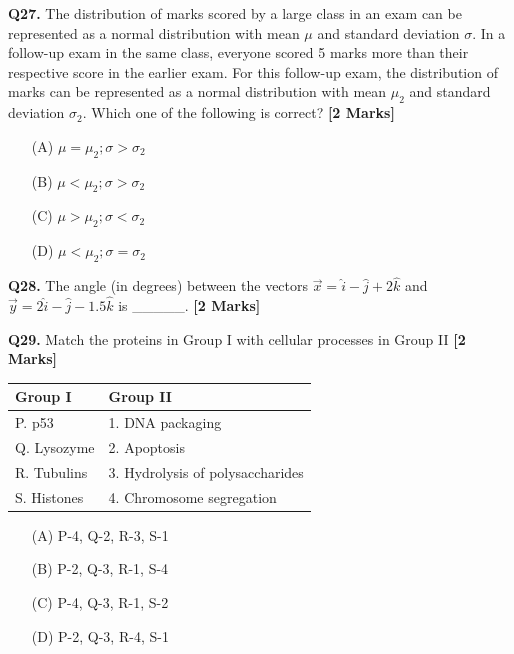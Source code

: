 \documentclass[11pt]{article}
\newcommand{\questionb}[2]{
    \noindent\textbf{Q#2.} #1 \hfill \textbf{[2 Marks]}
}
\begin{document}
\vspace{0.5cm}

\questionb{The distribution of marks scored by a large class in an exam can be represented as a normal distribution with mean $\mu$ and standard deviation $\sigma$. In a follow-up exam in the same class, everyone scored 5 marks more than their respective score in the earlier exam. For this follow-up exam, the distribution of marks can be represented as a normal distribution with mean $\mu_2$ and standard deviation $\sigma_2$. Which one of the following is correct?}{27}
\begin{enumerate}
    \item[(A)] $\mu = \mu_2; \sigma > \sigma_2$
    \item[(B)] $\mu < \mu_2; \sigma > \sigma_2$  
    \item[(C)] $\mu > \mu_2; \sigma < \sigma_2$
    \item[(D)] $\mu < \mu_2; \sigma = \sigma_2$
\end{enumerate}

\vspace{0.5cm}

\questionb{The angle (in degrees) between the vectors $\vec{x} = \hat{i} - \hat{j} + 2\hat{k}$ and $\vec{y} = 2\hat{i} - \hat{j} - 1.5\hat{k}$ is \_\_\_\_\_.}{28}

\vspace{0.5cm}

\questionb{Match the proteins in Group I with cellular processes in Group II}{29}

\begin{tabularx}{\linewidth}{|l|X|}
\hline
\textbf{Group I} & \textbf{Group II} \\
\hline
P. p53 & 1. DNA packaging \\
Q. Lysozyme & 2. Apoptosis \\
R. Tubulins & 3. Hydrolysis of polysaccharides \\
S. Histones & 4. Chromosome segregation \\
\hline
\end{tabularx}

\begin{enumerate}
    \item[(A)] P-4, Q-2, R-3, S-1
    \item[(B)] P-2, Q-3, R-1, S-4  
    \item[(C)] P-4, Q-3, R-1, S-2
    \item[(D)] P-2, Q-3, R-4, S-1
\end{enumerate}
\end{document}
